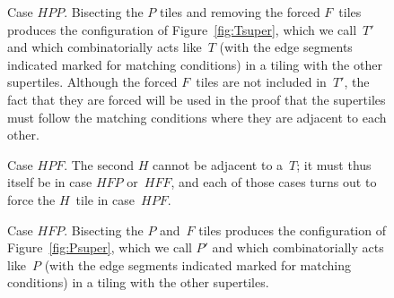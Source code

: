 \begin{figure}[htp!]
\begin{center}
\end{center}
\caption{Case $HPP$.  Bisecting the $P$ tiles and removing the forced
  $F$~tiles produces the configuration of Figure~\ref{fig:Tsuper},
  which we call~$T'$ and which combinatorially acts like~$T$ (with the
  edge segments indicated marked for matching conditions) in a tiling
  with the other supertiles.  Although the forced $F$~tiles are not
  included in~$T'$, the fact that they are forced will be used in the
  proof that the supertiles must follow the matching conditions where
  they are adjacent to each other.}
\label{fig:HPP}
\end{figure}

\begin{figure}[htp!]
\begin{center}
\end{center}
\caption{Case $HPF$.  The second $H$ cannot be adjacent to a~$T$; it
  must thus itself be in case $HFP$ or~$HFF$, and each of those cases
  turns out to force the $H$~tile in case~$HPF$.}
\label{fig:HPF}
\end{figure}

\begin{figure}[htp!]
\begin{center}
\end{center}
\caption{Case $HFP$.  Bisecting the $P$ and~$F$ tiles produces the
  configuration of Figure~\ref{fig:Psuper}, which we call $P'$ and
  which combinatorially acts like~$P$ (with the edge segments
  indicated marked for matching conditions) in a tiling with the other
  supertiles.}
\label{fig:HFP}
\end{figure}

